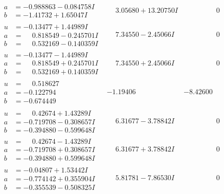 \documentclass[1p]{elsarticle_modified}
\theoremstyle{definition}
\begin{document}
$$\begin{array}{c|c|c}
\begin{aligned}
a &= -0.988863 - 0.084758 I \\
b &= -1.41732 + 1.65047 I\end{aligned}
 & \phantom{-}3.05680 + 13.20750 I & \phantom{-0.000000 } 0 \\ \hline\begin{aligned}
u &= -0.13477 + 1.44989 I \\
a &= \phantom{-}0.818549 - 0.245701 I \\
b &= \phantom{-}0.532169 - 0.140359 I\end{aligned}
 & \phantom{-}7.34550 - 2.45066 I & \phantom{-0.000000 } 0 \\ \hline\begin{aligned}
u &= -0.13477 - 1.44989 I \\
a &= \phantom{-}0.818549 + 0.245701 I \\
b &= \phantom{-}0.532169 + 0.140359 I\end{aligned}
 & \phantom{-}7.34550 + 2.45066 I & \phantom{-0.000000 } 0 \\ \hline\begin{aligned}
u &= \phantom{-}0.518627\phantom{ +0.000000I} \\
a &= -0.122794\phantom{ +0.000000I} \\
b &= -0.674449\phantom{ +0.000000I}\end{aligned}
 & -1.19406\phantom{ +0.000000I} & -8.42600\phantom{ +0.000000I} \\ \hline\begin{aligned}
u &= \phantom{-}0.42674 + 1.43289 I \\
a &= -0.719708 - 0.308657 I \\
b &= -0.394880 - 0.599648 I\end{aligned}
 & \phantom{-}6.31677 - 3.78842 I & \phantom{-0.000000 } 0 \\ \hline\begin{aligned}
u &= \phantom{-}0.42674 - 1.43289 I \\
a &= -0.719708 + 0.308657 I \\
b &= -0.394880 + 0.599648 I\end{aligned}
 & \phantom{-}6.31677 + 3.78842 I & \phantom{-0.000000 } 0 \\ \hline\begin{aligned}
u &= -0.04807 + 1.53442 I \\
a &= -0.774142 + 0.355904 I \\
b &= -0.355539 - 0.508325 I\end{aligned}
 & \phantom{-}5.81781 - 7.86530 I & \phantom{-0.000000 } 0 \\ \hline\begin{aligned}

\end{aligned}
\end{array}$$
\end{document}
